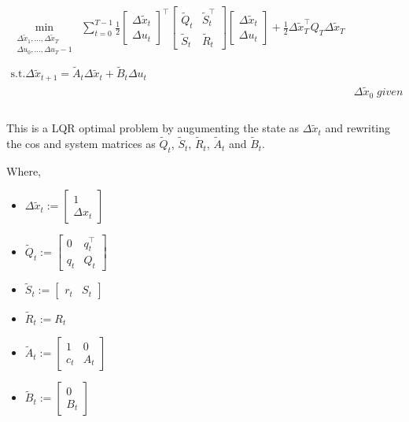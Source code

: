 \documentclass[a4paper,11pt,oneside]{book}
\begin{document}
\begin{equation*}
\begin{aligned}
\min_{\substack{{\Delta \tilde x_1,...,\Delta \tilde x_T}\\{\Delta u_0,...,\Delta u_T-1}}} \;  \sum\limits_{t=0}^{T-1}\frac{1}{2}\begin{bmatrix} \Delta \tilde x_t \\ \Delta u_t \end{bmatrix}^\top  \begin{bmatrix} \tilde Q_t & \tilde S_t^\top \\ \tilde S_t & \tilde R_t \end{bmatrix}\begin{bmatrix} \Delta \tilde x_t \\ \Delta u_t \end{bmatrix} +\frac{1}{2}\Delta \tilde x_T^\top Q_T\Delta \tilde x_T\\
\\\textrm{s.t.} \Delta \tilde x_{t+1}=\tilde A_t\Delta \tilde x_t+\tilde B_t\Delta u_t & \\
& \Delta \tilde x_0 \; given  \\
\end{aligned}
\end{equation*}
\\
This is a LQR optimal problem by augumenting the state as $\Delta \tilde x_t$ and rewriting the cos and system matrices as $\tilde Q_t$, $\tilde S_t$, $\tilde R_t$, $\tilde A_t$ and $\tilde B_t$.

Where,
\begin{itemize}
    \item $ \Delta \tilde x_t := \begin{bmatrix} 1 \\ \Delta x_t\end{bmatrix}$
    \item $ \tilde Q_t := \begin{bmatrix} 0 & q_t^\top \\ q_t & Q_t \end{bmatrix}$
    \item $ \tilde S_t := \begin{bmatrix} r_t & S_t \end{bmatrix}$
    \item $ \tilde R_t:= R_t $ 
    \item $ \tilde A_t:= \begin{bmatrix} 1 & 0 \\ c_t & A_t \end{bmatrix}$
    \item $ \tilde B_t:= \begin{bmatrix} 0 \\ B_t \end{bmatrix} $
\end{itemize}
\end{document}
